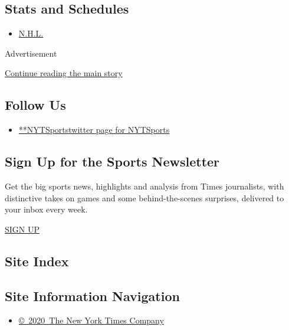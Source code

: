 \hypertarget{stats-and-schedules}{%
\subsection{Stats and Schedules}\label{stats-and-schedules}}

\begin{itemize}
\tightlist
\item
  \protect\hyperlink{}{N.H.L.}
\end{itemize}

Advertisement

\protect\hyperlink{after-mktg}{Continue reading the main story}

\hypertarget{follow-us}{%
\subsection{Follow Us}\label{follow-us}}

\begin{itemize}
\tightlist
\item
  \href{https://twitter.com/NYTSports}{**NYTSportstwitter page for
  NYTSports}
\end{itemize}

\hypertarget{sign-up-for-the-sports-newsletter}{%
\subsection{Sign Up for the Sports
Newsletter}\label{sign-up-for-the-sports-newsletter}}

Get the big sports news, highlights and analysis from Times journalists,
with distinctive takes on games and some behind-the-scenes surprises,
delivered to your inbox every week.

\href{/newsletters/signup/SP}{SIGN UP}

\hypertarget{site-index}{%
\subsection{Site Index}\label{site-index}}

\hypertarget{site-information-navigation}{%
\subsection{Site Information
Navigation}\label{site-information-navigation}}

\begin{itemize}
\tightlist
\item
  \href{https://help.nytimes3xbfgragh.onion/hc/en-us/articles/115014792127-Copyright-notice}{©~2020~The
  New York Times Company}
\end{itemize}

